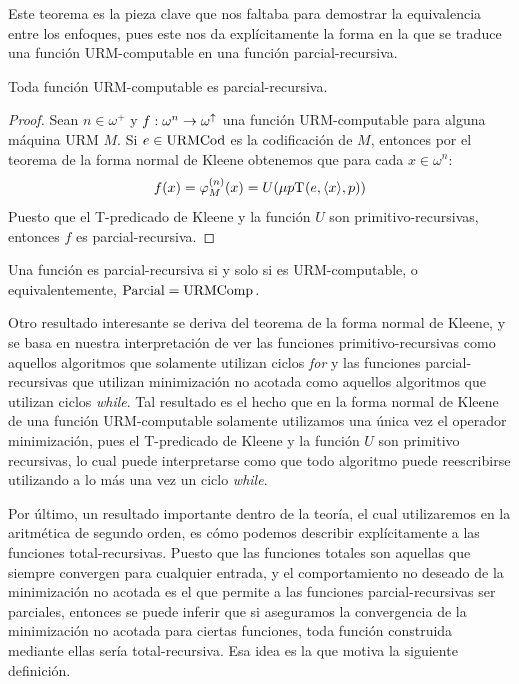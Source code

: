 Este teorema es la pieza clave que nos faltaba para demostrar la equivalencia entre los enfoques, pues este nos da explícitamente la forma en la que se traduce una función URM-computable en una función parcial-recursiva.

\begin{coll}
	Toda función URM-computable es parcial-recursiva.
\end{coll}

\begin{proof}
	Sean $n\in\omega^{+}$ y $f:\omega^{n}\to\omega^{\uparrow}$ una función URM-computable para alguna máquina URM $M$. Si $e\in\mathrm{URMCod}$ es la codificación de $M$, entonces por el teorema de la forma normal de Kleene obtenemos que para cada $x\in\omega^{n}$:
	\[
		f\pa*{x} =\PHI{M}[n]\pa*{x} = U\pa*{\mu p \KLEENE\pa*{e,\inner*{x}, p}}
	\]
	Puesto que el T-predicado de Kleene y la función $U$ son primitivo-recursivas, entonces $f$ es parcial-recursiva.
\end{proof}

\begin{coll}
	Una función es parcial-recursiva si y solo si es URM-computable, o equivalentemente, $\mathrm{Parcial} =\mathrm{URMComp}_{}$.
\end{coll}

Otro resultado interesante se deriva del teorema de la forma normal de Kleene, y se basa en nuestra interpretación de ver las funciones primitivo-recursivas como aquellos algoritmos que solamente utilizan ciclos \emph{for} y las funciones parcial-recursivas que utilizan minimización no acotada como aquellos algoritmos que utilizan ciclos \emph{while}. Tal resultado es el hecho que en la forma normal de Kleene de una función URM-computable solamente utilizamos una única vez el operador minimización, pues el T-predicado de Kleene y la función $U$ son primitivo recursivas, lo cual puede interpretarse como que todo algoritmo puede reescribirse utilizando a lo más una vez un ciclo \emph{while}.

Por último, un resultado importante dentro de la teoría, el cual utilizaremos en la aritmética de segundo orden, es cómo podemos describir explícitamente a las funciones total-recursivas. Puesto que las funciones totales son aquellas que siempre convergen para cualquier entrada, y el comportamiento no deseado de la minimización no acotada es el que permite a las funciones parcial-recursivas ser parciales, entonces se puede inferir que si aseguramos la convergencia de la minimización no acotada para ciertas funciones, toda función construida mediante ellas sería total-recursiva. Esa idea es la que motiva la siguiente definición.

